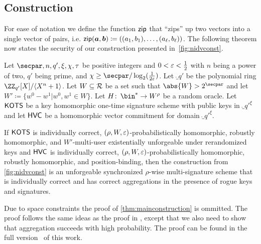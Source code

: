 \subsection{Construction}
For ease of notation we define the function $\mathsf{zip}$ that \enquote{zips} up two vectors into a single vector of pairs, i.e.
$
\mathsf{zip}(\boldsymbol{a},\boldsymbol{b}) \coloneqq ((a_1,b_1),\allowbreak\dots,\allowbreak(a_\ell,b_\ell))
$.
The following theorem now states the security of our construction presented in~\autoref{fig:nidvconst}.
\begin{theorem}\label{thm:mainconstruction}
Let $\secpar,n,q',\xi,\chi,\tau$ be positive integers and $0<\varepsilon < \tfrac{1}{2}$ with $n$ being a power of two, $q'$ being prime, and $\chi \geq \secpar/\log_2(\frac{1}{2\errorbound})$.
Let $\ring_{q'}$ be the polynomial ring $\defringqq$.
Let $W \subseteq \mathcal{R}$ be a set such that $\abs{W} > 2^\secpar$ and let $W' \coloneqq \{w^0-w^1| w^0,w^1 \in W\}$.
Let $H \colon\, \bin^* \to W^\rho$ be a random oracle.
Let $\mathsf{KOTS}$ be a key homomorphic one-time signature scheme with public keys in $\ring_{q'}^\xi$ and let $\mathsf{HVC}$ be a homomorphic vector commitment for domain $\ring_{q'}^\xi$.

If $\mathsf{KOTS}$ is individually correct, $(\rho,W,\varepsilon)$-probabilistically homomorphic, robustly homomorphic, and $W'$-multi-user existentially unforgeable under rerandomized keys and $\mathsf{HVC}$ is individually correct, $(\rho,W,\varepsilon)$-probabilistically homomorphic, robustly homomorphic, and position-binding, then the construction from \autoref{fig:nidvconst} is an unforgeable synchronized $\rho$-wise multi-signature scheme that is individually correct and has correct aggregations in the presence of rogue keys and signatures.
\end{theorem}
Due to space constraints the proof of \autoref{thm:mainconstruction} is ommitted.
The proof follows the same ideas as the proof in \cite{CCS:FleSimZha22}, except that we also need to show that aggregation succeeds with high probability.
The proof can be found in the full version~\cite{fullversion} of this work.



